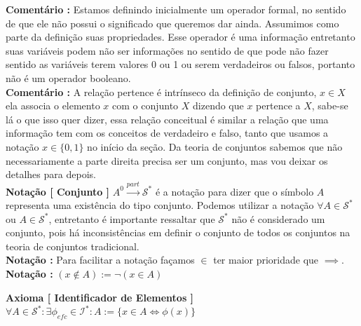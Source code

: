\documentclass[10pt,a4paper]{report}
\begin{document}
\textbf{Comentário :} Estamos definindo inicialmente um operador formal, no sentido de que ele não possui o significado que queremos dar ainda. Assumimos como parte da definição suas propriedades. Esse operador é uma informação entretanto suas variáveis podem não ser informações no sentido de que pode não fazer sentido as variáveis terem valores 0 ou 1 ou serem verdadeiros ou falsos, portanto não é um operador booleano.\\

\textbf{Comentário :} A relação pertence é intrínseco da definição de conjunto, $x \in X$ ela associa o elemento $x$ com o conjunto $X$ dizendo que $x$ pertence a $X$, sabe-se lá o que isso quer dizer, essa relação conceitual é similar a relação que uma informação tem com os conceitos de verdadeiro e falso, tanto que usamos a notação $x \in \{0,1\}$ no início da seção. Da teoria de conjuntos sabemos que não necessariamente a parte direita precisa ser um conjunto, mas vou deixar os detalhes para depois.\\

\textbf{Notação [ Conjunto ]} $ A^0 \overset{part}{\rightarrow} \mathcal{S}^* $ é a notação para dizer que o símbolo $A$ representa uma existência do tipo conjunto. Podemos utilizar a notação $ \forall A \in \mathcal{S}^* $ ou $A \in \mathcal{S}^*$, entretanto é importante ressaltar que $\mathcal{S}^*$ não é considerado um conjunto, pois há inconsistências em definir o conjunto de todos os conjuntos na teoria de conjuntos tradicional.\\

\textbf{Notação :} Para facilitar a notação façamos $\in$ ter maior prioridade que $\implies$.\\

\textbf{Notação :} $ (x \notin A) := \neg( x \in A) $

\hspace{\baselineskip}

\textbf{Axioma [ Identificador de Elementos ]} $ \forall A  \in \mathcal{S}^* : \exists \phi_{efc} \in \mathcal{I}^* : A:=\{ x \in A \iff \phi(x) \} $\\
\end{document}
